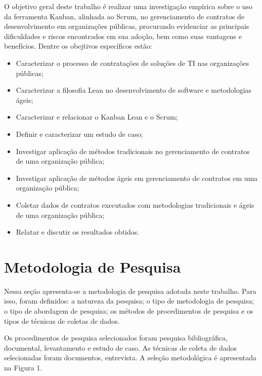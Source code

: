 O objetivo geral deste trabalho é realizar uma investigação empírica sobre o uso da ferramenta Kanban, alinhada ao Scrum, no gerenciamento de contratos de desenvolvimento em organizações públicas, procurando evidenciar as principais dificuldades e riscos encontrados em sua adoção, bem como suas vantagens e benefícios. Dentre os obejtivos específicos estão:

\begin{itemize}
\item Caracterizar o processo de contratações de soluções de TI nas organizações públicas;
\item Caracterizar a filosofia Lean no desenvolvimento de software e metodologias ágeis;
\item Caracterizar e relacionar o Kanban Lean e o Scrum;
\item Definir e caracterizar um estudo de caso;
\item Investigar aplicação de métodos tradicionais no gerenciamento de contratos de uma organização pública;
\item Investigar aplicação de métodos ágeis em gerenciamento de contratos em uma organização pública;
\item Coletar dados de contratos executados com metodologias tradicionais e ágeis de uma organização pública;
\item Relatar e discutir os resultados obtidos.
\end{itemize}

\section[Metodologia de Pesquisa]{Metodologia de Pesquisa}

Nessa seção apresenta-se a metodologia de pesquisa adotada neste trabalho.
Para isso, foram definidos: a natureza da pesquisa; o tipo de metodologia de pesquisa; o tipo de abordagem de pesquisa; os métodos de
procedimentos de pesquisa e os tipos de técnicas de coletas de dados.

Os procedimentos de pesquisa selecionados foram pesquisa bibliográfica,
documental, levantamento e estudo de caso. As técnicas de coleta de dados selecionadas foram
documentos, entrevista. A seleção
metodológica é apresentada na Figura 1.

